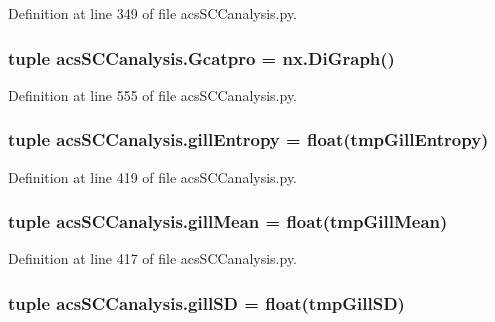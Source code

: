 Definition at line 349 of file acs\-S\-C\-Canalysis.\-py.

\hypertarget{a00102_ad88c3dd8eb89ddbe8720462b03f35003}{
\subsubsection[{Gcatpro}]{\setlength{\rightskip}{0pt plus 5cm}tuple acs\-S\-C\-Canalysis.\-Gcatpro = nx.\-Di\-Graph()}}\label{a00102_ad88c3dd8eb89ddbe8720462b03f35003}


Definition at line 555 of file acs\-S\-C\-Canalysis.\-py.

\hypertarget{a00102_a4c214eb4f6812d6182bae32715bce3ad}{
\subsubsection[{gill\-Entropy}]{\setlength{\rightskip}{0pt plus 5cm}tuple acs\-S\-C\-Canalysis.\-gill\-Entropy = float(tmp\-Gill\-Entropy)}}\label{a00102_a4c214eb4f6812d6182bae32715bce3ad}


Definition at line 419 of file acs\-S\-C\-Canalysis.\-py.

\hypertarget{a00102_a4e862896701636d17752f14810ff687f}{
\subsubsection[{gill\-Mean}]{\setlength{\rightskip}{0pt plus 5cm}tuple acs\-S\-C\-Canalysis.\-gill\-Mean = float(tmp\-Gill\-Mean)}}\label{a00102_a4e862896701636d17752f14810ff687f}


Definition at line 417 of file acs\-S\-C\-Canalysis.\-py.

\hypertarget{a00102_acdb3e72aea08c29494799fd08763b406}{
\subsubsection[{gill\-S\-D}]{\setlength{\rightskip}{0pt plus 5cm}tuple acs\-S\-C\-Canalysis.\-gill\-S\-D = float(tmp\-Gill\-S\-D)}}\label{a00102_acdb3e72aea08c29494799fd08763b406}


